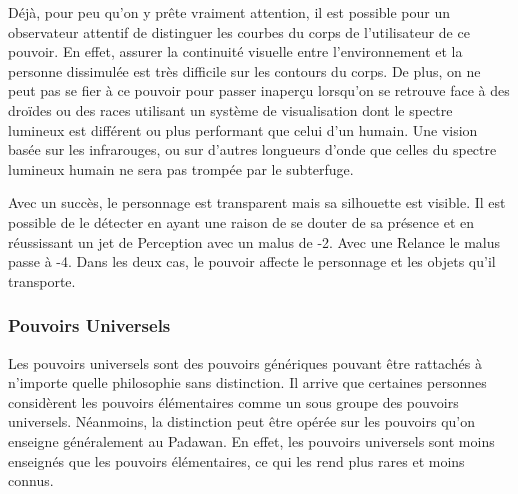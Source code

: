 \begin{description}[align=left]
        Déjà, pour peu qu’on y prête vraiment attention, il est possible pour un observateur attentif de distinguer les courbes du corps de l’utilisateur de ce pouvoir. En effet, assurer la continuité visuelle entre l’environnement et la personne dissimulée est très difficile sur les contours du corps. De plus, on ne peut pas se fier à ce pouvoir pour passer inaperçu lorsqu’on se retrouve face à des droïdes ou des races utilisant un système de visualisation dont le spectre lumineux est différent ou plus performant que celui d’un humain. Une vision basée sur les infrarouges, ou sur d’autres longueurs d’onde que celles du spectre lumineux humain ne sera pas trompée par le subterfuge.

        Avec un succès, le personnage est transparent mais sa silhouette est visible. Il est possible de le détecter en ayant une raison de se douter de sa présence et en réussissant un jet de Perception avec un malus de -2. Avec une Relance le malus passe à -4. Dans les deux cas, le pouvoir affecte le personnage et les objets qu’il transporte.
        \\

\end{description}

\subsubsection{Pouvoirs Universels}

Les pouvoirs universels sont des pouvoirs génériques pouvant être rattachés à n’importe quelle philosophie sans distinction. Il arrive que certaines personnes considèrent les pouvoirs élémentaires comme un sous groupe des pouvoirs universels. Néanmoins, la distinction peut être opérée sur les pouvoirs qu’on enseigne généralement au Padawan. En effet, les pouvoirs universels sont moins enseignés que les pouvoirs élémentaires, ce qui les rend plus rares et moins connus. 

